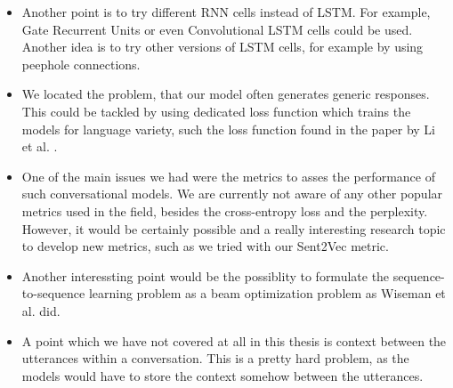 \begin{itemize}
  \item Another point is to try different RNN cells instead of LSTM. For example, Gate Recurrent Units \cite{Chung:2014} or even Convolutional LSTM \cite{Xingjian:2015} cells could be used. Another idea is to try other versions of LSTM cells, for example by using peephole connections.

  \item We located the problem, that our model often generates generic responses. This could be tackled by using dedicated loss function which trains the models for language variety, such the loss function found in the paper by Li et al. \cite{Li:2016}.

  \item One of the main issues we had were the metrics to asses the performance of such conversational models. We are currently not aware of any other popular metrics used in the field, besides the cross-entropy loss and the perplexity. However, it would be certainly possible and a really interesting research topic to develop new metrics, such as we tried with our Sent2Vec metric.

  \item Another interessting point would be the possiblity to formulate the sequence-to-sequence learning problem as a beam optimization problem as Wiseman et al. \cite{Wiseman:2016} did.

  \item A point which we have not covered at all in this thesis is context between the utterances within a conversation. This is a pretty hard problem, as the models would have to store the context somehow between the utterances.
\end{itemize}
